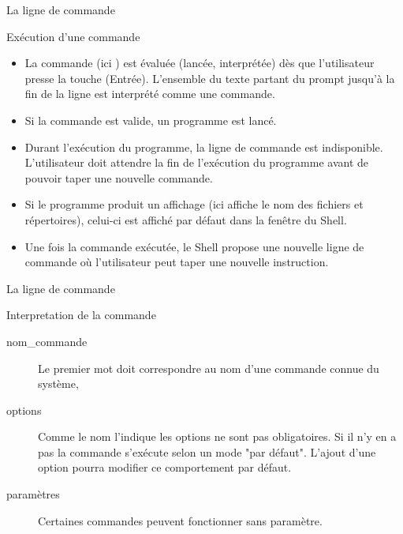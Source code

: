 \begin{frame}{La ligne de commande}
  \begin{center}
  \end{center}
  \begin{block}{Exécution d'une commande}
    \begin{itemize}
    \item La commande (ici ) est évaluée (lancée, interprétée) dès que l'utilisateur presse la touche \Return (Entrée). L'ensemble du texte partant du prompt jusqu'à la fin de la ligne est interprété comme une commande.
    \item Si la commande est valide, un programme est lancé.
    \item Durant l'exécution du programme, la ligne de commande est indisponible. L'utilisateur doit attendre la fin de l'exécution du programme avant de pouvoir taper une nouvelle commande.
    \item Si le programme produit un affichage (ici  affiche le nom des fichiers et répertoires), celui-ci est affiché par défaut dans la fenêtre du Shell.
    \item Une fois la commande exécutée, le Shell propose une nouvelle ligne de commande où l'utilisateur peut taper une nouvelle instruction.
    \end{itemize}
  \end{block}
\end{frame}
\begin{frame}{La ligne de commande}
  \begin{center}
  \end{center}
  \begin{block}{Interpretation de la commande}
    \begin{description}
    \item[nom\_commande] Le premier mot doit correspondre au nom d'une commande connue du système,
    \item[options] Comme le nom l'indique les options ne sont pas obligatoires. Si il n'y en a pas la commande s'exécute selon un mode "par défaut". L'ajout d'une option pourra modifier ce comportement par défaut.
    \item[paramètres] Certaines commandes peuvent fonctionner sans paramètre.
    \end{description}
  \end{block}
\end{frame}
